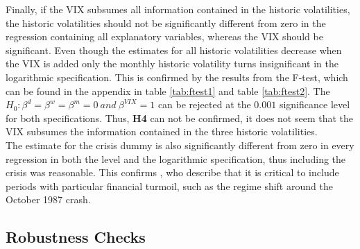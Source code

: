 Finally, if the VIX subsumes all information contained in the historic volatilities, the historic volatilities should not be significantly different from zero in the regression containing all explanatory variables, whereas the VIX should be significant. Even though the estimates for all historic volatilities decrease when the VIX is added only the monthly historic volatility turns insignificant in the logarithmic specification. This is confirmed by the results from the F-test, which can be found in the appendix in table \ref{tab:ftest1} and table \ref{tab:ftest2}. The $H_{0}: \beta^{d} = \beta^{w} = \beta^{m} = 0 \ and \ \beta^{VIX} = 1$ can be rejected at the $0.001$ significance level for both specifications. Thus, \textbf{\ac{H4}} can not be confirmed, it does not seem that the VIX subsumes the information contained in the three historic volatilities.\\
The estimate for the crisis dummy is also significantly different from zero in every regression in both the level and the logarithmic specification, thus including the crisis was reasonable. This confirms \textcite{jiang2003}, who describe that it is critical to include periods with particular financial turmoil, such as the regime shift  around the October 1987 crash.

%


\subsection{Robustness Checks}\label{sec51Robustness}

